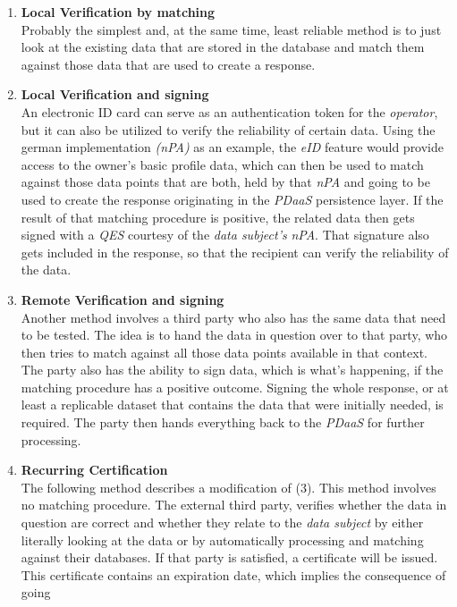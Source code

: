 \documentclass[12pt,english,a4paper,titlepage,cleardoublepage=empty,dottedtoc]{report}
\begin{document}
\begin{enumerate}
\def\labelenumi{(\arabic{enumi})}
\item
  \textbf{Local Verification by matching}\\
  Probably the simplest and, at the same time, least reliable method is
  to just look at the existing data that are stored in the database and
  match them against those data that are used to create a response.
\item
  \textbf{Local Verification and signing}\\
  An electronic ID card can serve as an authentication token for the
  \emph{operator}, but it can also be utilized to verify the reliability
  of certain data. Using the german implementation \emph{(nPA)} as an
  example, the \emph{eID} feature would provide access to the owner's
  basic profile data, which can then be used to match against those data
  points that are both, held by that \emph{nPA} and going to be used to
  create the response originating in the \emph{PDaaS} persistence layer.
  If the result of that matching procedure is positive, the related data
  then gets signed with a \emph{QES} courtesy of the \emph{data
  subject's} \emph{nPA}. That signature also gets included in the
  response, so that the recipient can verify the reliability of the
  data.
\item
  \textbf{Remote Verification and signing}\\
  Another method involves a third party who also has the same data that
  need to be tested. The idea is to hand the data in question over to
  that party, who then tries to match against all those data points
  available in that context. The party also has the ability to sign
  data, which is what's happening, if the matching procedure has a
  positive outcome. Signing the whole response, or at least a replicable
  dataset that contains the data that were initially needed, is
  required. The party then hands everything back to the \emph{PDaaS} for
  further processing.
\item
  \textbf{Recurring Certification}\\
  The following method describes a modification of (3). This method
  involves no matching procedure. The external third party, verifies
  whether the data in question are correct and whether they relate to
  the \emph{data subject} by either literally looking at the data or by
  automatically processing and matching against their databases. If that
  party is satisfied, a certificate will be issued. This certificate
  contains an expiration date, which implies the consequence of going

\end{enumerate}
\end{document}
